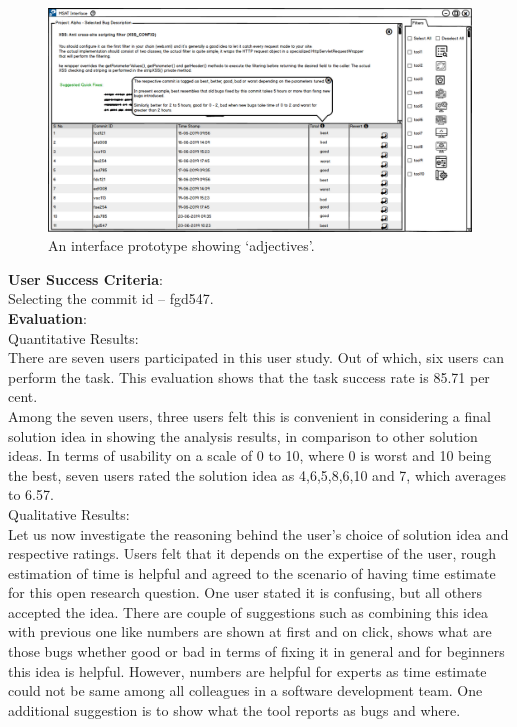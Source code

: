 \begin{figure}[hbt!]
	\centering
	\includegraphics[width=\linewidth]{figures/solution_ideas_snaps/S23_adjectives}
	\caption{An interface prototype showing ‘adjectives’.}
	\label{fig:S23_adjectives}
\end{figure}

\textbf{User Success Criteria}: \\

Selecting the commit id – fgd547. \\

\textbf{Evaluation}: \\

Quantitative Results: \\

There are seven users participated in this user study. Out of which, six users can perform the task. This evaluation shows that the task success rate is 85.71 per cent. \\

Among the seven users, three users felt this is convenient in considering a final solution idea in showing the analysis results, in comparison to other solution ideas. In terms of usability on a scale of 0 to 10, where 0 is worst and 10 being the best, seven users rated the solution idea as 4,6,5,8,6,10 and 7, which averages to 6.57. \\

Qualitative Results: \\

Let us now investigate the reasoning behind the user’s choice of solution idea and respective ratings. Users felt that it depends on the expertise of the user, rough estimation of time is helpful and agreed to the scenario of having time estimate for this open research question. One user stated it is confusing, but all others accepted the idea. There are couple of suggestions such as combining this idea with previous one like numbers are shown at first and on click, shows what are those bugs whether good or bad in terms of fixing it in general and for beginners this idea is helpful. However, numbers are helpful for experts as time estimate could not be same among all colleagues in a software development team. One additional suggestion is to show what the tool reports as bugs and where. \\

